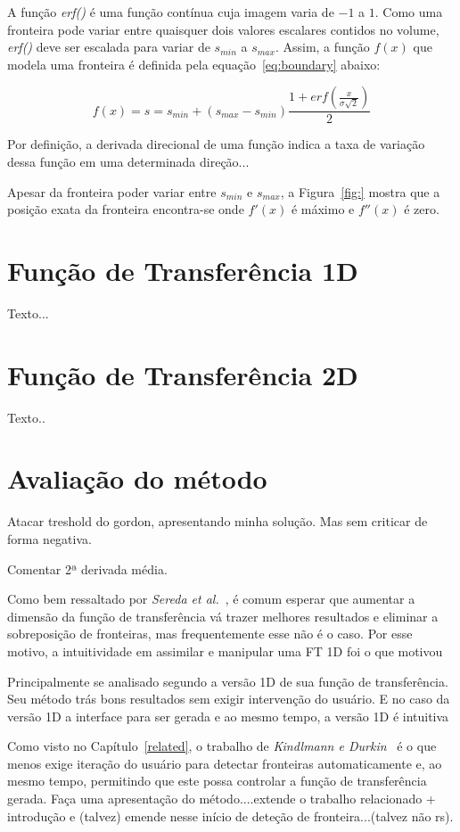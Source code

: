	A função \textit{erf()} é uma função contínua cuja imagem varia de $-1$ a $1$. Como uma fronteira pode variar entre quaisquer dois valores escalares contidos no volume, \textit{erf()} deve ser escalada para variar de $s_{min}$ a $s_{max}$. Assim, a função $f(x)$ que modela uma fronteira é definida pela equação~\eqref{eq:boundary} abaixo:

\begin{equation} \label{eq:boundary}
	f(x) = s = s_{min} + (s_{max} - s_{min}) \frac{1 + erf(\frac{x}{\sigma\sqrt{2}})}{2}
\end{equation}
	
	Por definição, a derivada direcional de uma função indica a taxa de variação dessa função em uma determinada direção...
	
	Apesar da fronteira poder variar entre $s_{min}$ e $s_{max}$, a Figura~\ref{fig:} mostra que a posição exata da fronteira encontra-se onde $f'(x)$ é máximo e $f''(x)$ é zero.
    
\section{Função de Transferência 1D}
\label{gordon.1d}
	Texto...
    
\section{Função de Transferência 2D}
\label{gordon.2d}    
    Texto..
    
\section{Avaliação do método}
\label{gordon.aval}    
    Atacar treshold do gordon, apresentando minha solução. Mas sem criticar de forma negativa.
    
    Comentar 2ª derivada média.
    
    Como bem ressaltado por \textit{Sereda et al.}~\cite{sereda1}, é comum esperar que aumentar a dimensão da função de transferência vá trazer melhores resultados e eliminar a sobreposição de fronteiras, mas frequentemente esse não é o caso. Por esse motivo, a intuitividade em assimilar e manipular uma FT 1D foi o que motivou
    
    
    Principalmente se analisado segundo a versão 1D de sua função de transferência. Seu método trás bons resultados sem exigir intervenção do usuário. E no caso da versão 1D a interface para ser gerada e ao mesmo tempo, a versão 1D é intuitiva
    
    
    Como visto no Capítulo~\ref{related}, o trabalho de \textit{Kindlmann e Durkin}~\cite{gordon} é o que menos exige iteração do usuário para detectar fronteiras automaticamente e, ao mesmo tempo, permitindo que este possa controlar a função de transferência gerada.
    Faça uma apresentação do método....extende o trabalho relacionado + introdução e (talvez) emende nesse início de deteção de fronteira...(talvez não rs).